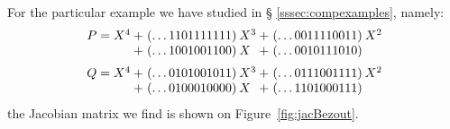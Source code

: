 \documentclass[11pt]{article}
\numberwithin{equation}{section}
\numberwithin{figure}{section}
\theoremstyle{definition}
\begin{document}
\medskip

For the particular example we have studied in \S 
\ref{sssec:compexamples}, namely:
$$\begin{array}{r@{\hspace{0.2ex}}r@{\hspace{0.5ex}}l@{\hspace{0.2ex}}r@{\hspace{0.5ex}}l}
P = X^4 + {}& (\ldots 1101111111) & X^3 
        + {}& (\ldots 0011110011) & X^2 \\
      {}+ {}& (\ldots 1001001100) & X^{\phantom{1}} 
        + {}& (\ldots 0010111010) \medskip \\
Q = X^4 + {}& (\ldots 0101001011) & X^3 
        + {}& (\ldots 0111001111) & X^2 \\
      {}+ {}& (\ldots 0100010000) & X^{\phantom{1}} 
        + {}& (\ldots 1101000111) 
\end{array}$$
the Jacobian matrix we find is shown on Figure~\ref{fig:jacBezout}.
%
\end{document}
